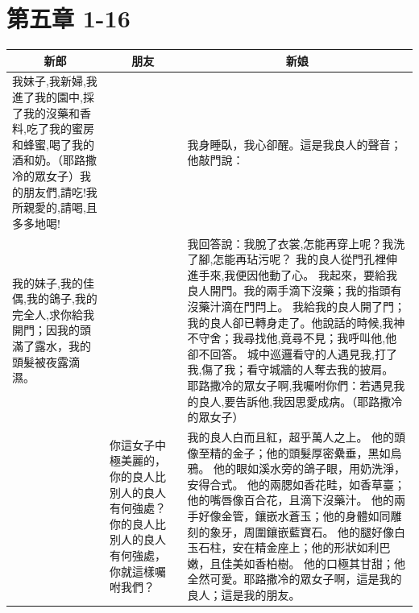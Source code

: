 \section{第五章    1-16}
\begin{table}[H]
\centering
\begin{tabular}{p{6.5cm}|p{2.0cm}|p{8.50cm}}\hline\hline
\multicolumn{1}{c|}{新郎}&\multicolumn{1}{c|}{朋友}&\multicolumn{1}{c}{新娘}\\\hline
我妹子,我新婦,我進了我的園中,採了我的沒藥和香料,吃了我的蜜房和蜂蜜,喝了我的酒和奶。（耶路撒冷的眾女子）我的朋友們,請吃!我所親愛的,請喝,且多多地喝!
&&我身睡臥，我心卻醒。這是我良人的聲音；他敲門說：\\\hline

我的妹子,我的佳偶,我的鴿子,我的完全人,求你給我開門；因我的頭滿了露水，我的頭髮被夜露滴濕。
&&我回答說：我脫了衣裳,怎能再穿上呢？我洗了腳,怎能再玷污呢？
我的良人從門孔裡伸進手來,我便因他動了心。
我起來，要給我良人開門。我的兩手滴下沒藥；我的指頭有沒藥汁滴在門閂上。
我給我的良人開了門；我的良人卻已轉身走了。他說話的時候,我神不守舍；我尋找他,竟尋不見；我呼叫他,他卻不回答。
城中巡邏看守的人遇見我,打了我,傷了我；看守城牆的人奪去我的披肩。
耶路撒冷的眾女子啊,我囑咐你們：若遇見我的良人,要告訴他,我因思愛成病。（耶路撒冷的眾女子）\\\hline
&你這女子中極美麗的，你的良人比別人的良人有何強處？你的良人比別人的良人有何強處，你就這樣囑咐我們？
&我的良人白而且紅，超乎萬人之上。
他的頭像至精的金子；他的頭髮厚密纍垂，黑如烏鴉。
他的眼如溪水旁的鴿子眼，用奶洗淨，安得合式。
他的兩腮如香花畦，如香草臺；他的嘴唇像百合花，且滴下沒藥汁。
他的兩手好像金管，鑲嵌水蒼玉；他的身體如同雕刻的象牙，周圍鑲嵌藍寶石。
他的腿好像白玉石柱，安在精金座上；他的形狀如利巴嫩，且佳美如香柏樹。
他的口極其甘甜；他全然可愛。耶路撒冷的眾女子啊，這是我的良人；這是我的朋友。\\\hline
\end{tabular}
\end{table}



